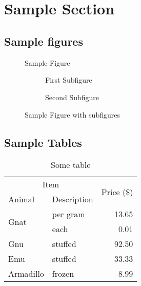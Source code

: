 \documentclass[a4paper]{article}
\title{\HWTitle \\ \vspace{.25cm}}
\date{\HWDueDate}
\author{\HWAuthorName}
\begin{document}
\maketitle


\hfill

\section{Sample Section} %
\label{sec:sample_section}

\subsection{Sample figures} %
\label{sub:sample_figures}


\begin{figure}[htp]
  \centering
    \caption{Sample Figure}
    \label{fig:sample fig}
\end{figure}

\begin{figure}[htp]
  \centering
  \begin{subfigure}{.45\textwidth}
    \centering
    \caption{First Subfigure}
    \label{fig:samplesubfiga}
  \end{subfigure}%
  \hfill
  \begin{subfigure}{.45\textwidth}
    \centering
    \caption{Second Subfigure}
    \label{fig:samplesubfigb}
  \end{subfigure}
  \caption{Sample Figure with subfigures}
  \label{fig:samplesubfig}
\end{figure}

\subsection{Sample Tables} %
\label{sub:sample_tables}

\begin{table}\centering
\renewcommand{\arraystretch}{1.2}
\begin{tabular}{llr}
\toprule
\multicolumn{2}{c}{Item} & \multirow{2}{*}{Price (\$)} \\
\cmidrule(r){1-2}
Animal    & Description &   \\
\midrule
\multirow{2}{*}{Gnat}      & per gram    & 13.65      \\
          &    each     & 0.01       \\
Gnu       & stuffed     & 92.50      \\
Emu       & stuffed     & 33.33      \\
Armadillo & frozen      & 8.99       \\
\bottomrule
\end{tabular}
\caption{Some table }
\end{table}
\end{document}
